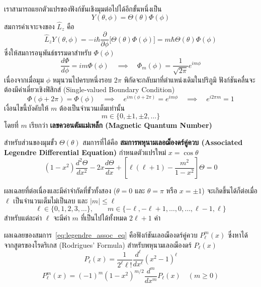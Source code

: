 เราสามารถแยกตัวแปรของฟังก์ชันเชิงมุมต่อไปได้อีกขั้นหนึ่งเป็น
\begin{equation}
Y(\theta, \phi) = \Theta(\theta) \Phi(\phi)
\end{equation}
สมการค่าเจาะจงของ $\hat{L}_z$ คือ
\begin{equation}
\hat{L}_z Y(\theta, \phi) = -i\hbar \frac{\partial}{\partial \phi}\big[ \Theta(\theta)\Phi(\phi) \big] = m\hbar \Theta(\theta)\Phi(\phi)
\end{equation}
ซึ่งให้สมการอนุพันธ์ธรรมดาสำหรับ $\Phi(\phi)$
\begin{equation}
\frac{d\Phi}{d\phi} = i m \Phi(\phi) \quad \implies \quad \Phi_m(\phi) = \frac{1}{\sqrt{2\pi}} e^{im\phi}
\label{eq:phi_solution}
\end{equation}
เนื่องจากเมื่อมุม $\phi$ หมุนวนไปครบหนึ่งรอบ $2\pi$ พิกัดจะกลับมาที่ตำแหน่งเดิมในปริภูมิ ฟังก์ชันคลื่นจะต้องมีค่าเดี่ยวเชิงฟิสิกส์ (Single-valued Boundary Condition)
\begin{equation}
\Phi(\phi + 2\pi) = \Phi(\phi) \quad \implies \quad e^{im(\phi + 2\pi)} = e^{im\phi} \quad \implies \quad e^{i 2\pi m} = 1
\end{equation}
เงื่อนไขนี้บังคับให้ $m$ ต้องเป็นจำนวนเต็มเท่านั้น
\begin{equation}
m \in \{ 0, \pm 1, \pm 2, \dots \}
\end{equation}
โดยที่ $m$ เรียกว่า \textbf{เลขควอนตัมแม่เหล็ก (Magnetic Quantum Number)}

สำหรับส่วนของมุมขั้ว $\Theta(\theta)$ สมการที่ได้คือ \textbf{สมการพหุนามเลอฌ็องดร์คู่ควบ (Associated Legendre Differential Equation)} กำหนดตัวแปรใหม่ $x = \cos\theta$
\begin{equation}
(1 - x^2) \frac{d^2 \Theta}{dx^2} - 2x \frac{d\Theta}{dx} + \left[ \ell(\ell + 1) - \frac{m^2}{1 - x^2} \right] \Theta = 0
\label{eq:legendre_assoc_eq}
\end{equation}

ผลเฉลยที่ต่อเนื่องและมีค่าจำกัดที่ขั้วทั้งสอง ($\theta = 0$ และ $\theta = \pi$ หรือ $x = \pm 1$) จะเกิดขึ้นได้ก็ต่อเมื่อ $\ell$ เป็นจำนวนเต็มไม่เป็นลบ และ $|m| \le \ell$
\begin{equation}
\ell \in \{ 0, 1, 2, 3, \dots \}, \qquad m \in \{ -\ell, -\ell+1, \dots, 0, \dots, \ell-1, \ell \}
\end{equation}
สำหรับแต่ละค่า $\ell$ จะมีค่า $m$ ที่เป็นไปได้ทั้งหมด $2\ell + 1$ ค่า

ผลเฉลยของสมการ~\eqref{eq:legendre_assoc_eq} คือฟังก์ชันเลอฌ็องดร์คู่ควบ $P_\ell^m(x)$ ซึ่งหาได้จากสูตรของโรดริเกส (Rodrigues' Formula) สำหรับพหุนามเลอฌ็องดร์ $P_\ell(x)$
\begin{equation}
P_\ell(x) = \frac{1}{2^\ell \ell!} \frac{d^\ell}{dx^\ell} (x^2 - 1)^\ell
\end{equation}
\begin{equation}
P_\ell^m(x) = (-1)^m (1 - x^2)^{m/2} \frac{d^m}{dx^m} P_\ell(x) \quad (m \ge 0)
\end{equation}

